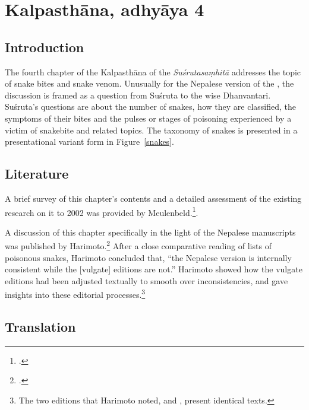 \section{Kalpasthāna, adhyāya 4}

\subsection{Introduction}
The fourth chapter of the Kalpasthāna of the \emph{Suśrutasaṃhitā} addresses 
the topic of snake bites and snake venom.  Unusually for the Nepalese version of 
the \SS, the discussion is framed as a question from Suśruta to the wise 
Dhanvantari.  Suśruta's questions are about the number of snakes, how they 
are classified, the symptoms of their bites and the pulses or stages of poisoning 
experienced by a victim of snakebite and related topics.  The taxonomy of snakes 
is presented in a presentational variant form in Figure~\ref{snakes}.


    
\subsection{Literature}
A brief survey of this chapter's contents and a detailed assessment of the
existing research on it to 2002 was provided by Meulenbeld.\footcite[IA,
292--294]{meul-hist}. 
    
A discussion of this chapter specifically in the light of the Nepalese
manuscripts was published by Harimoto.\footcite[101--104]{hari-2011} After a
close comparative reading of lists of poisonous snakes, Harimoto concluded
that, “the Nepalese version is internally consistent while the [vulgate]
editions are not.”  Harimoto showed how the vulgate editions had been
adjusted textually to smooth over inconsistencies, and gave insights into
these editorial processes.\footnote{The two editions that Harimoto noted,
    \cite{vulgate} and \cite{bhat-1889}, present identical texts.}


\subsection{Translation}

